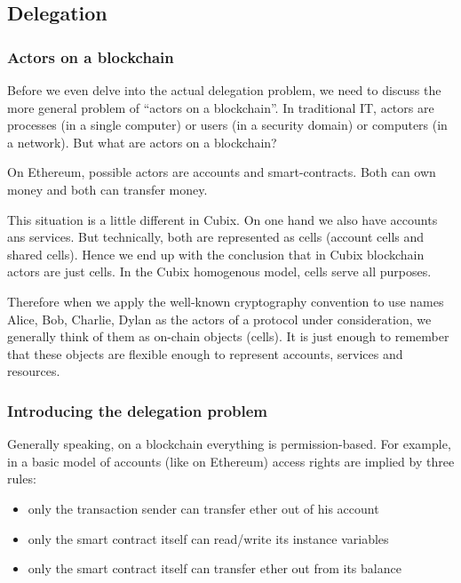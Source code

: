 \documentclass[a4paper]{article}
\begin{document}
\subsection{Delegation}

\subsubsection{Actors on a blockchain}

Before we even delve into the actual delegation problem, we need to discuss the more general problem of ``actors on a blockchain''. In traditional IT, actors are processes (in a single computer) or users (in a security domain) or computers (in a network). But what are actors on a blockchain?

On Ethereum, possible actors are accounts and smart-contracts. Both can own money and both can transfer money.

This situation is a little different in Cubix. On one hand we also have accounts ans services. But technically, both are represented as cells (account cells and shared cells). Hence we end up with the conclusion that in Cubix blockchain actors are just cells. In the Cubix homogenous model, cells serve all purposes.

Therefore when we apply the well-known cryptography convention to use names Alice, Bob, Charlie, Dylan as the actors of a protocol under consideration, we generally think of them as on-chain objects (cells). It is just enough to remember that these objects are flexible enough to represent accounts, services and resources.

\subsubsection{Introducing the delegation problem}

Generally speaking, on a blockchain everything is permission-based. For example, in a basic model of accounts (like on Ethereum) access rights are implied by three rules:

\begin{itemize}
  \item only the transaction sender can transfer ether out of his account
  \item only the smart contract itself can read/write its instance variables
  \item only the smart contract itself can transfer ether out from its balance
\end{itemize}
\end{document}
